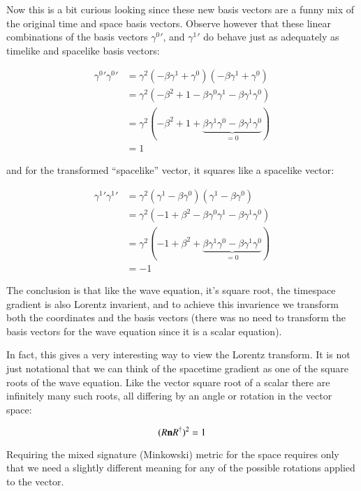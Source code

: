 \documentclass{article}      %
\begin{document}
Now this is a bit curious looking since these new basis vectors are a funny mix of the original time and space basis vectors.  Observe however that these linear combinations of the basis vectors ${\gamma^0}'$, and ${\gamma^1}'$ do behave just as adequately as timelike and spacelike basis vectors:

\begin{align*}
{\gamma^0}' {\gamma^0}' 
&= \gamma^2 (-\beta \gamma^1 + \gamma^0 ) (-\beta \gamma^1 + \gamma^0 ) \\
&= \gamma^2 (-\beta^2 + 1 -\beta \gamma^0\gamma^1 -\beta \gamma^1 \gamma^0 ) \\
&= \gamma^2 (-\beta^2 + 1 + \underbrace{\beta \gamma^1\gamma^0 -\beta \gamma^1 \gamma^0}_{=0} ) \\
&= 1 
\end{align*}

and for the transformed ``spacelike'' vector, it squares like a spacelike vector:

\begin{align*}
{\gamma^1}' {\gamma^1}' 
&= \gamma^2 (\gamma^1 -\beta \gamma^0) (\gamma^1 -\beta \gamma^0) \\
&= \gamma^2 (-1 + \beta^2 -\beta\gamma^0 \gamma^1 -\beta\gamma^1\gamma^0) \\
&= \gamma^2 (-1 + \beta^2 + \underbrace{\beta \gamma^1\gamma^0 -\beta \gamma^1 \gamma^0}_{=0} ) \\
&= -1 
\end{align*}

The conclusion is that like the wave equation, it's square root, the timespace gradient is also Lorentz invarient, and to achieve this invarience we
transform both the coordinates and the basis vectors (there was no need to transform the basis vectors for the wave equation since it is a scalar
equation).

In fact, this gives a very interesting way to view the Lorentz transform.  It is not just notational that we can think of the spacetime gradient as one of the square roots of the wave equation.
Like the vector square root of a scalar 
there are infinitely many such roots, all differing by an angle or rotation in the vector space:

\begin{equation*}
(R \mathbf{n} R^\dagger)^2 = 1
\end{equation*}

Requiring the mixed signature (Minkowski) metric for the space requires only that we need a slightly different meaning for any of the possible rotations
applied to the vector.
\end{document}
